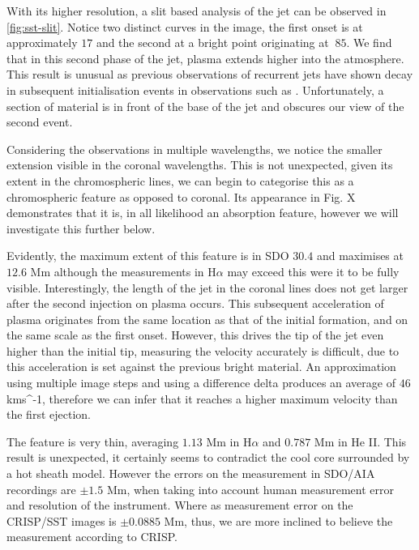 \documentclass{emulateapj}
\begin{document}
With its higher resolution, a slit based analysis of the jet can be observed in \cref{fig:sst-slit}.
Notice two distinct curves in the image, the first onset is at approximately $17$ and the second at a bright point originating at $~85$.
We find that in this second phase of the jet, plasma extends higher into the atmosphere.
This result is unusual as previous observations of recurrent jets have shown decay in subsequent initialisation events in observations such as \cite{Jiang2007}.
Unfortunately, a section of material is in front of the base of the jet and obscures our view of the second event.

Considering the observations in multiple wavelengths, we notice the smaller extension visible in the coronal wavelengths.
This is not unexpected, given its extent in the chromospheric lines, we can begin to categorise this as a chromospheric feature as opposed to coronal.
Its appearance in Fig. X demonstrates that it is, in all likelihood an absorption feature, however we will investigate this further below.

Evidently, the maximum extent of this feature is in SDO $30.4$ and maximises at $12.6$ Mm although the measurements in H$\alpha$ may exceed this were it to be fully visible.
Interestingly, the length of the jet in the coronal lines does not get larger after the second injection on plasma occurs.
This subsequent acceleration of plasma originates from the same location as that of the initial formation, and on the same scale as the first onset.
However, this drives the tip of the jet even higher than the initial tip, measuring the velocity accurately is difficult, due to this acceleration is set against the previous bright material.
An approximation using multiple image steps and using a difference delta produces an average of $46$ kms{^{-1}}, therefore we can infer that it reaches a higher maximum velocity than the first ejection.

The feature is very thin, averaging $1.13$ Mm in H$\alpha$ and $0.787$ Mm in He II. 
This result is unexpected, it certainly seems to contradict the cool core surrounded by a hot sheath model.
However the errors on the measurement in SDO/AIA recordings are $\pm1.5$ Mm, when taking into account human measurement error and resolution of the instrument.
Where as measurement error on the CRISP/SST images is $\pm0.0885$ Mm, thus, we are more inclined to believe the measurement according to CRISP.
\end{document}

